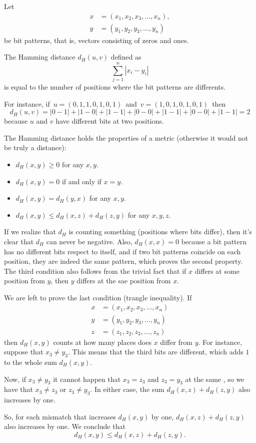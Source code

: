 \documentclass[12pt]{article}
\begin{document}
Let 
\begin{align*}
x &= (x_1,x_2,x_3,\ldots,x_n),\\
y &= (y_1,y_2,y_3,\ldots,y_n)
\end{align*}
be bit patterns, that is, vectors consisting of zeros and ones.

The Hamming distance $d_H(u,v)$ defined as 
\[
\sum_{j=1}^n |x_i-y_i|
\]
is equal to the number of positions where the bit patterns are differents.


For instance, if 
\,$u =(0,1,1,0,1,0,1)$\, and \,$v =(1,0,1,0,1,0,1)$\,
 then
\[
d_H(u,v) = |0-1|+ |1-0| + |1-1| + |0-0|+|1-1| + |0-0| + |1-1| = 2
\]
because $u$ and $v$ have different bits at two positions.

The Hamming distance holds the properties of a metric (otherwise it would not be truly a distance):
\begin{itemize}
\item $d_H(x,y)\geq 0$ for any $x,y$.\\
\item $d_H(x,y)=0$ if and only if $x=y$.\\
\item $d_H(x,y) = d_H(y,x)$ for any $x,y$.\\
\item $d_H(x,y)\leq d_H(x,z) +  d_H(z,y)$ for any $x,y,z$.
\end{itemize}

If we realize that $d_H$ is counting something (positions where bits differ), then it's clear that $d_H$ can never be negative. Also, $d_H(x,x)= 0$ because a bit pattern has no different bits respect to itself, and if two bit patterns coincide on each position, they are indeed the same pattern, which proves the second property. The third condition also follows from the trivial fact that if $x$ differs at some position from $y$, then $y$ differs at the sae position from $x$.

We are left to prove the last condition (trangle inequality).
If 
\begin{align*}
x &= (x_1,x_2,x_3,\ldots,x_n)\\
y &= (y_1,y_2,y_3,\ldots,y_n)\\
z &= (z_1,z_2,z_3,\ldots,z_n)
\end{align*}
then $d_H(x,y)$ counts at how many places does $x$ differ from $y$. For instance, suppose that $x_3\neq y_3$. This means that the third bits are different, which adds $1$ to the whole sum $d_H(x,y)$.

Now, if $x_3\neq y_3$ it cannot happen that $x_3=z_3$ and $z_3=y_3$ at the same , so we have that $x_3\neq z_3$ or $z_3\neq y_3$. In either case, the sum $d_H(x,z) + d_H(z,y)$ also increases by one.

So, for each mismatch that increases $d_H(x,y)$ by one, $d_H(x,z)+ d_H(z,y)$ also increases by one. We conclude that
\[
d_H(x,y)\leq d_H(x,z) + d_H(z,y).
\]
\end{document}
